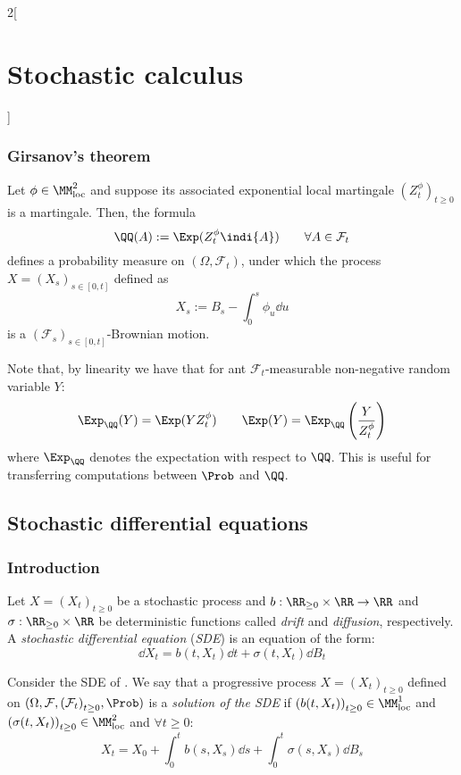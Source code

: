 \documentclass[../../../main_math.tex]{subfiles}
\begin{document}
\begin{multicols}{2}[\section{Stochastic calculus}]
  \subsubsection{Girsanov's theorem}
  \begin{theorem}
    Let $\phi\in\MM^2_{\text{loc}}$ and suppose its associated exponential local martingale ${(Z_t^\phi)}_{t\geq 0}$ is a martingale. Then, the formula
    $$
      \QQ(A):=\Exp(Z_t^\phi\indi{A})\qquad\forall A\in \mathcal{F}_t
    $$
    defines a probability measure on $(\Omega, \mathcal{F}_t)$, under which the process $X={(X_s)}_{s\in[0,t]}$ defined as
    $$
      X_s:=B_s-\int_0^s \phi_u\dd{u}
    $$
    is a ${(\mathcal{F}_s)}_{s\in[0,t]}$-Brownian motion.
  \end{theorem}
  \begin{remark}
    Note that, by linearity we have that for ant $\mathcal{F}_t$-measurable non-negative random variable $Y$:
    $$
      \Exp_\QQ(Y)=\Exp(YZ_t^\phi)\qquad
      \Exp(Y)=\Exp_\QQ\left(\frac{Y}{Z_t^\phi}\right)
    $$
    where $\Exp_\QQ$ denotes the expectation with respect to $\QQ$.  This is useful for transferring computations between $\Prob$ and $\QQ$.
  \end{remark}
  \subsection{Stochastic differential equations}
  \subsubsection{Introduction}
  \begin{definition}
    Let $X={(X_t)}_{t\geq 0}$ be a stochastic process and $b:\RR_{\geq 0}\times\RR\to \RR$ and $\sigma:\RR_{\geq 0}\times \RR$ be deterministic functions called \emph{drift} and \emph{diffusion}, respectively. A \emph{stochastic differential equation} (\emph{SDE}) is an equation of the form:
    \begin{equation}\label{SC:SDE_eq}
      \dd{X_t}=b(t,X_t)\dd{t}+\sigma(t,X_t)\dd{B_t}
    \end{equation}
  \end{definition}
  \begin{definition}
    Consider the SDE of . We say that a progressive process $X={(X_t)}_{t\geq 0}$ defined on $(\Omega, \mathcal{F}, {(\mathcal{F}_t)}_{t\geq 0}, \Prob)$ is a \emph{solution of the SDE} if ${(b(t,X_t))}_{t\geq 0}\in\MM^1_{\text{loc}}$ and ${(\sigma(t,X_t))}_{t\geq 0}\in\MM^2_{\text{loc}}$ and $\forall t\geq 0$:
    $$
      X_t=X_0+\int_0^t b(s,X_s)\dd{s}+\int_0^t \sigma(s,X_s)\dd{B_s}
    $$
  \end{definition}

\end{multicols}
\end{document}
